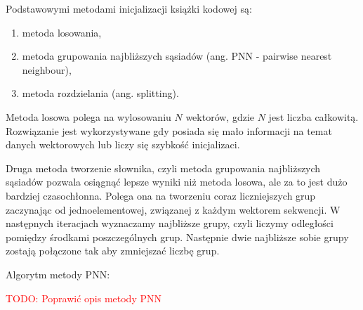 \documentclass{article}
\newcommand{\todo}[1]{\textcolor{red}{TODO: #1}}
\begin{document}
Podstawowymi metodami inicjalizacji książki kodowej są:

\begin{enumerate}
  \item metoda losowania,
  \item metoda grupowania najbliższych sąsiadów (ang. PNN - pairwise nearest neighbour),
  \item metoda rozdzielania (ang. splitting).
\end{enumerate}

Metoda losowa polega na wylosowaniu $N$ wektorów, gdzie $N$ jest liczba całkowitą.
Rozwiązanie jest wykorzystywane gdy posiada się mało informacji na temat danych wektorowych lub liczy się
szybkość inicjalizaci.

Druga metoda tworzenie słownika, czyli metoda grupowania najbliższych sąsiadów pozwala osiągnąć lepsze wyniki niż metoda losowa,
ale za to jest dużo bardziej czasochłonna.
Polega ona na tworzeniu coraz liczniejszych grup zaczynając od jednoelementowej, związanej z każdym wektorem sekwencji.
W następnych iteracjach wyznaczamy najbliższe grupy, czyli liczymy odległości pomiędzy środkami poszczególnych grup.
Następnie dwie najbliższe sobie grupy zostają połączone tak aby zmniejszać liczbę grup.

Algorytm metody PNN:

\todo{Poprawić opis metody PNN}
\end{document}

